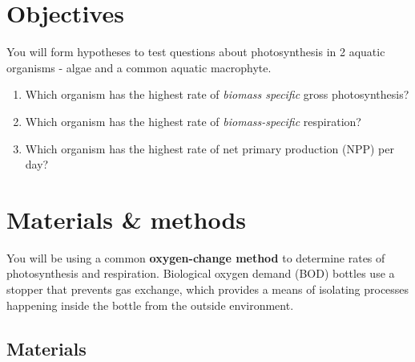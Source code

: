 \documentclass[]{book}
\begin{document}
\hypertarget{objectives-1}{%
\section{Objectives}\label{objectives-1}}

You will form hypotheses to test questions about photosynthesis in 2 aquatic organisms - algae and a common aquatic macrophyte.

\begin{enumerate}
\def\labelenumi{\arabic{enumi}.}
\item
  Which organism has the highest rate of \emph{biomass specific} gross photosynthesis?
\item
  Which organism has the highest rate of \emph{biomass-specific} respiration?
\item
  Which organism has the highest rate of net primary production (NPP) per day?
\end{enumerate}

\hypertarget{materials-methods}{%
\section{Materials \& methods}\label{materials-methods}}

You will be using a common \textbf{oxygen-change method} to determine rates of photosynthesis and respiration. Biological oxygen demand (BOD) bottles use a stopper that prevents gas exchange, which provides a means of isolating processes happening inside the bottle from the outside environment.

\pagebreak

\hypertarget{materials}{%
\subsection{Materials}\label{materials}}
\end{document}
